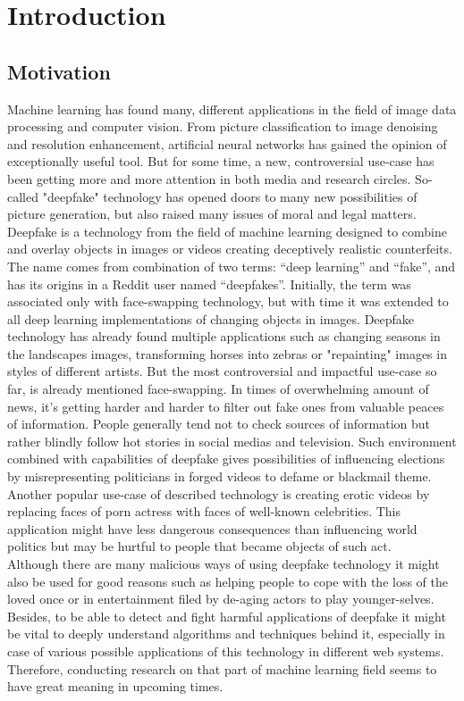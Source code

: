 \chapter{Introduction}
\section{Motivation}
Machine learning has found many, different applications in the field of image data processing and computer vision. From picture classification to image denoising and resolution enhancement, artificial neural networks has gained the opinion of exceptionally useful tool. But for some time, a new, controversial use-case has been getting more and more attention in both media and research circles. So-called "deepfake" technology has opened doors to many new possibilities of picture generation, but also raised many issues of moral and legal matters.\\

Deepfake is a technology from the field of machine learning designed to combine and overlay objects in images or videos creating deceptively realistic counterfeits. The name comes from combination of two terms: ``deep learning'' and ``fake'', and has its origins in a Reddit user named ``deepfakes''. Initially, the term was associated only with face-swapping technology, but with time it was extended to all deep learning implementations of changing objects in images. Deepfake technology has already found multiple applications such as changing seasons in the landscapes images, transforming horses into zebras or "repainting" images in styles of different artists. But the most controversial and impactful use-case so far, is already mentioned face-swapping. In times of overwhelming amount of news, it's getting harder and harder to filter out fake ones from valuable peaces of information. People generally tend not to check sources of information but rather blindly follow hot stories in social medias and television. Such environment combined with capabilities of deepfake gives possibilities of influencing elections by misrepresenting politicians in forged videos to defame or blackmail theme. Another popular use-case of described technology is creating erotic videos by replacing faces of porn actress with faces of well-known celebrities. This application might have less dangerous consequences than influencing world politics but may be hurtful to people that became objects of such act.\\

Although there are many malicious ways of using deepfake technology it might also be used for good reasons such as helping people to cope with the loss of the loved once or in entertainment filed by de-aging actors to play younger-selves. Besides, to be able to detect and fight harmful applications of deepfake it might be vital to deeply understand algorithms  and techniques behind it, especially in case of various possible applications of this technology in  different web systems. Therefore, conducting research on that part of machine learning field seems to have great meaning in upcoming times.

